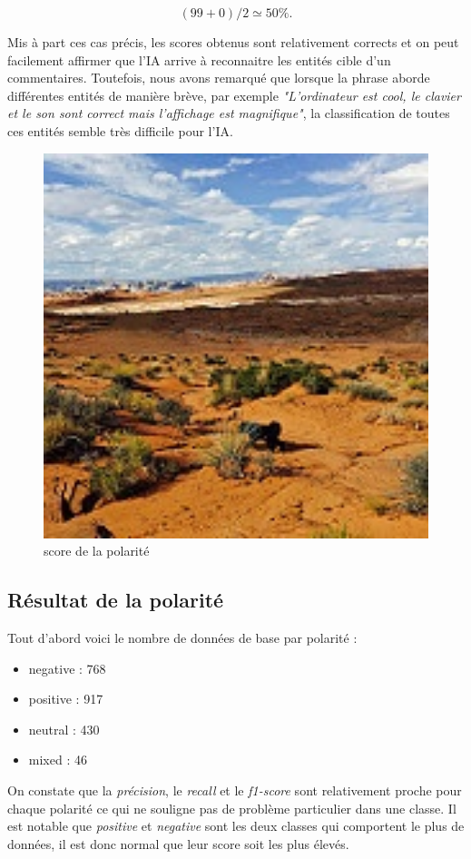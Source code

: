 \documentclass[12pt ,a4paper ]{article}
\begin{document}
\begin{multicols}{2}
\begin{equation}
(99 + 0) / 2 \simeq 50 \%.
\end{equation}

Mis à part ces cas précis, les scores obtenus sont relativement corrects et on peut facilement affirmer que l'IA arrive à reconnaitre les entités cible d'un commentaires. Toutefois, nous avons remarqué que lorsque la phrase aborde différentes entités de manière brève, par exemple \textit{"L'ordinateur est cool, le clavier et le son sont correct mais l'affichage est magnifique"}, la classification de toutes ces entités semble très difficile pour l'IA. \\

\begin{figure}[t]
    \begin{center}
        \includegraphics[width=1.15\textwidth]{3808.jpg}
    \end{center}
    \caption{score de la polarité}
\end{figure}
\newpage
\subsection{Résultat de la polarité}
Tout d'abord voici le nombre de données de base par polarité :
\begin{itemize}
\item negative : 768
\item positive : 917
\item neutral : 430
\item mixed : 46
\end{itemize}
\medskip
On constate que la \textit{précision}, le \textit{recall} et le \textit{f1-score} sont relativement proche pour chaque polarité ce qui ne souligne pas de problème particulier dans une classe. 
Il est notable que \textit{positive} et \textit{negative} sont les deux  classes qui comportent le plus de données, il est donc normal que leur score soit les plus élevés. \\


\end{multicols}
\end{document}

